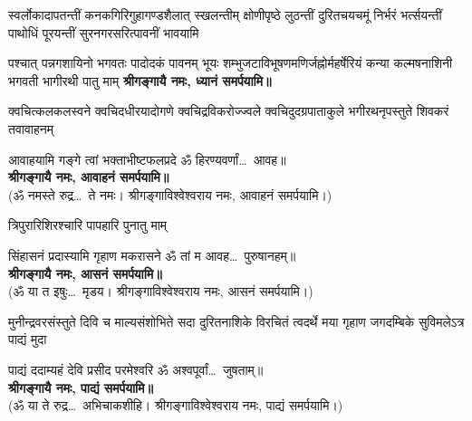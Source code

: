 \renewcommand{\devAya}{श्रीगङ्गायै नमः,}
\begin{center}


{स्वर्लोकादापतन्तीं कनकगिरिगुहागण्डशैलात् स्खलन्तीम्}
{क्षोणीपृष्ठे लुठन्तीं दुरितचयचमूं निर्भरं भर्त्सयन्तीं}
{पाथोधिं पूरयन्तीं सुरनगरसरित्पावनीं भावयामि}

{पश्चात् पन्नगशायिनो भगवतः पादोदकं पावनम्}
{भूयः शम्भुजटाविभूषणमणिर्जह्नोर्महर्षेरियं}
{कन्या कल्मषनाशिनी भगवती भागीरथी पातु माम्}
\textbf{\devAya{} ध्यानं समर्पयामि॥}


{क्वचित्कलकलस्वने क्वचिदधीरयादोगणे}
{क्वचिद्रविकरोज्ज्वले क्वचिदुदग्रपाताकुले}
{भगीरथनृपस्तुते शिवकरं तवावाहनम्}

{आवाहयामि गङ्गे त्वां भक्ताभीष्टफलप्रदे}
ॐ हिरण्यवर्णां\ldots\ आवह॥\\
\textbf{\devAya{} आवाहनं समर्पयामि॥}\\
(ॐ नमस्ते रुद्र\ldots\ ते नमः। श्रीगङ्गाविश्वेश्वराय नमः, आवाहनं समर्पयामि।)


{त्रिपुरारिशिरश्चारि पापहारि पुनातु माम्}

{सिंहासनं प्रदास्यामि गृहाण मकरासने}
ॐ तां म आवह\ldots\ पुरुषानहम्॥\\
\textbf{\devAya{} आसनं समर्पयामि॥}\\
(ॐ या त इषुः\ldots\ मृडय। श्रीगङ्गाविश्वेश्वराय नमः, आसनं समर्पयामि।)


{मुनीन्द्रवरसंस्तुते दिवि च माल्यसंशोभिते}
{सदा दुरितनाशिके विरचितं त्वदर्थे मया}
{गृहाण जगदम्बिके सुविमलेऽत्र पाद्यं मुदा}

{पाद्यं ददाम्यहं देवि प्रसीद परमेश्वरि}
ॐ अश्वपूर्वां\ldots\ जुषताम्॥\\
\textbf{\devAya{} पाद्यं समर्पयामि॥}\\
(ॐ या ते रुद्र\ldots\ अभिचाकशीहि। श्रीगङ्गाविश्वेश्वराय नमः, पाद्यं समर्पयामि।)



\end{center}
